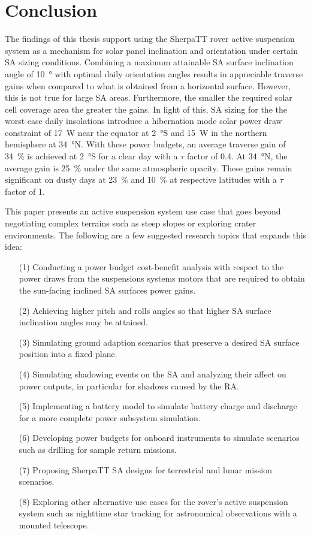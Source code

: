 \documentclass[twocolumn,letterpaper]{IEEEAerospaceCLS}  %
\begin{document}
\section{Conclusion}
The findings of this thesis support using the SherpaTT rover active suspension system as a mechanism for solar panel inclination and orientation under certain \ac{SA} sizing conditions. Combining a maximum attainable \ac{SA} surface inclination angle of \SI{10}{\degree} with optimal daily orientation angles results in appreciable traverse gains when compared to what is obtained from a horizontal surface. However, this is not true for large \ac{SA} areas. Furthermore, the smaller the required solar cell coverage area the greater the gains. In light of this, \ac{SA} sizing for the the worst case daily insolations introduce a hibernation mode solar power draw constraint of \SI{17}{\watt} near the equator at \SI{2}{\degree}S and \SI{15}{\watt} in the northern hemisphere at \SI{34}{\degree}N. With these power budgets, an average traverse gain of \SI{34}{\percent} is achieved at \SI{2}{\degree}S for a clear day with a $\tau$ factor of 0.4. At \SI{34}{\degree}N, the average gain is \SI{25}{\percent} under the same atmospheric opacity. These gains remain significant on dusty days at \SI{23}{\percent} and \SI{10}{\percent} at respective latitudes with a $\tau$ factor of 1.

This paper presents an active suspension system use case that goes beyond negotiating complex terrains such as steep slopes or exploring crater environments. The following are a few suggested research topics that expands this idea:

\begin{itemize}
  \item [(1)] Conducting a power budget cost-benefit analysis with respect to the power draws from the suspensions systems motors that are required to obtain the sun-facing inclined \ac{SA} surfaces power gains.
  \item [(2)] Achieving higher pitch and rolls angles so that higher \ac{SA} surface inclination angles may be attained.
  \item [(3)] Simulating ground adaption scenarios that preserve a desired \ac{SA} surface position into a fixed plane.
  \item [(4)] Simulating shadowing events on the \ac{SA} and analyzing their affect on power outputs, in particular for shadows caused by the \ac{RA}.
  \item [(5)] Implementing a battery model to simulate battery charge and discharge for a more complete power subsystem simulation.
  \item [(6)] Developing power budgets for onboard instruments to simulate scenarios such as drilling for sample return missions.
  \item [(7)] Proposing SherpaTT \ac{SA} designs for terrestrial and lunar mission scenarios.
  \item [(8)] Exploring other alternative use cases for the rover's active suspension system such as nighttime star tracking for astronomical observations with a mounted telescope.
\end{itemize}
\end{document}
